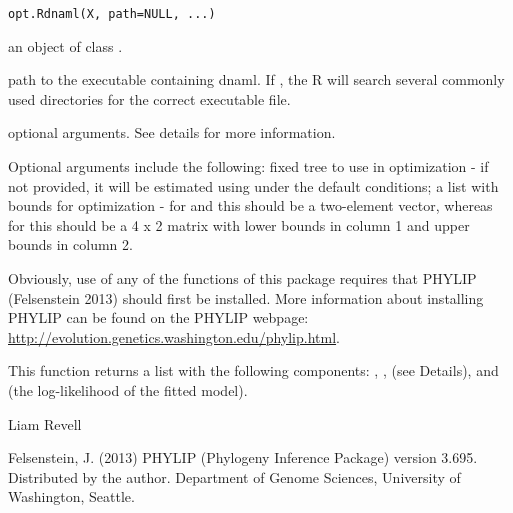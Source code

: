 \documentclass[a4paper]{book}
\begin{document}
%
\begin{Usage}
\begin{verbatim}
opt.Rdnaml(X, path=NULL, ...)
\end{verbatim}
\end{Usage}
%
\begin{Arguments}
\begin{ldescription}
\item[\code{X}] an object of class .
\item[\code{path}] path to the executable containing dnaml. If , the R will search several commonly used directories for the correct executable file.
\item[\code{...}] optional arguments. See details for more information.
\end{ldescription}
\end{Arguments}
%
\begin{Details}\relax
Optional arguments include the following:  fixed tree to use in optimization - if not provided, it will be estimated using  under the default conditions;  a list with bounds for optimization - for  and  this should be a two-element vector, whereas for  this should be a 4 x 2 matrix with lower bounds in column 1 and upper bounds in column 2.

Obviously, use of any of the functions of this package requires that PHYLIP (Felsenstein 2013) should first be installed. More information about installing PHYLIP can be found on the PHYLIP webpage: \url{http://evolution.genetics.washington.edu/phylip.html}.
\end{Details}
%
\begin{Value}
This function returns a list with the following components: , ,  (see Details), and  (the log-likelihood of the fitted model).
\end{Value}
%
\begin{Author}\relax
Liam Revell 
\end{Author}
%
\begin{References}\relax
Felsenstein, J. (2013) PHYLIP (Phylogeny Inference Package) version 3.695. Distributed by the author. Department of Genome Sciences, University of Washington, Seattle.
\end{References}
%
\begin{SeeAlso}\relax
{}
\end{SeeAlso}
\end{document}
